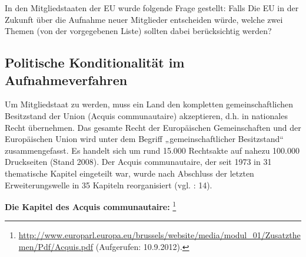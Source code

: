 In den Mitgliedstaaten der EU wurde folgende Frage gestellt: Falls Die EU in der Zukunft über die Aufnahme neuer Mitglieder entscheiden würde, welche zwei Themen (von der vorgegebenen Liste) sollten dabei berücksichtig werden?

\subsection{Politische Konditionalität im Aufnahmeverfahren}
Um Mitgliedstaat zu werden, muss ein Land den kompletten gemeinschaftlichen Besitzstand der Union (Acquis communautaire) akzeptieren, d.h. in nationales Recht übernehmen. Das gesamte Recht der Europäischen Gemeinschaften und der Europäischen Union wird unter dem Begriff „gemeinschaftlicher Besitzstand“ zusammengefasst. Es handelt sich um rund 15.000 Rechtsakte auf nahezu 100.000 Druckseiten (Stand 2008). Der Acquis communautaire, der seit 1973 in 31 thematische Kapitel eingeteilt war, wurde nach Abschluss der letzten Erweiterungswelle in 35 Kapiteln reorganisiert (vgl. \cite{summa}: 14). \par

{\bf Die Kapitel des Acquis communautaire:} \footnote{\url{http://www.europarl.europa.eu/brussels/website/media/modul_01/Zusatzthemen/Pdf/Acquis.pdf} (Aufgerufen: 10.9.2012).}\\


